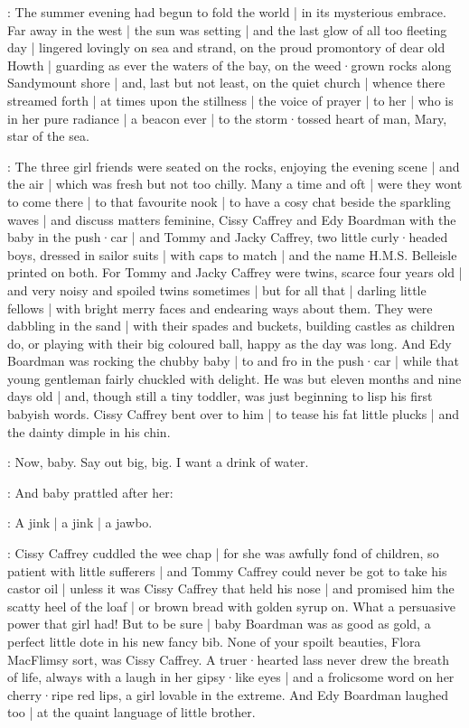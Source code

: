 :
The summer evening
had begun to fold the world |
in its mysterious embrace.
Far away in the west |
the sun was setting |
and the last glow of all too fleeting day |
lingered lovingly on sea and strand,
on the proud promontory
of dear old Howth |
guarding as ever
the waters of the bay,
on the weed·grown rocks along Sandymount shore |
and,
last but not least,
on the quiet church |
whence there streamed forth |
at times upon the stillness |
the voice of prayer |
to her |
who is in her pure radiance |
a beacon ever |
to the storm·tossed heart of man,
Mary,
star of the sea.

:
The three girl friends were seated on the rocks,
enjoying the evening scene |
and the air |
which was fresh but not too chilly.%
Many a time and oft |
were they wont to come there |
to that favourite nook |
to have a cosy chat
beside the sparkling waves |
and discuss matters feminine,
Cissy Caffrey
and Edy Boardman with the baby in the push·car |
and Tommy and Jacky Caffrey,
two little curly·headed boys,
dressed in sailor suits |
with caps to match |
and the name H.M.S. Belleisle printed on both.
For Tommy and Jacky Caffrey were twins,
scarce four years old |
and very noisy and spoiled twins sometimes |
but for all that |
darling little fellows |
with bright merry faces and endearing ways about them.
They were dabbling in the sand |
with their spades and buckets,
building castles as children do,
or playing with their big coloured ball,
happy as the day was long.%
And Edy Boardman was rocking the chubby baby |
to and fro in the push·car |
while that young gentleman
fairly chuckled with delight.
He was but eleven months and nine days old |
and,
though still a tiny toddler,
was just beginning to lisp his first babyish words.
Cissy Caffrey bent over to him |
to tease his fat little plucks |
and the dainty dimple in his chin.

\cissy:
Now,
baby.
Say out big,
big.
I want a drink of water.

:
And baby prattled after her:

\baby:
A jink |
a jink |
a jawbo.

:
Cissy Caffrey cuddled the wee chap |
for she was awfully fond of children,
so patient with little sufferers |%
and Tommy Caffrey could never be got to take his castor oil |
unless it was Cissy Caffrey that held his nose |
and promised him the scatty heel of the loaf |
or brown bread with golden syrup on.
What a persuasive power that girl had!
But to be sure |
baby Boardman was as good as gold,
a perfect little dote in his new fancy bib.
None of your spoilt beauties,
Flora MacFlimsy sort,
was Cissy Caffrey.
A truer·hearted lass never drew the breath of life,
always with a laugh in her gipsy·like eyes |
and a frolicsome word on her cherry·ripe red lips,
a girl lovable in the extreme.
And Edy Boardman laughed too |
at the quaint language of little brother.

